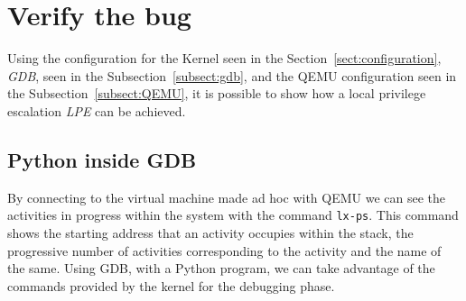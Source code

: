 \documentclass{masterthesis}
\newcommand{\refToSection}[1]{Section~\ref{sect:#1}\xspace}
\newcommand{\refToSubSection}[1]{Subsection~\ref{subsect:#1}\xspace}
\begin{document}
\section{Verify the bug}
\label{sect:bug}


Using the configuration for the Kernel seen in the \refToSection{configuration}, \emph{GDB}, seen in the \refToSubSection{gdb}, and the QEMU configuration seen in the \refToSubSection{QEMU}, it is possible to show how a local privilege escalation \emph{LPE} can be achieved.



\subsection{Python inside GDB}
\label{subsect:py_gdb}

By connecting to the virtual machine made ad hoc with QEMU we can see the activities in progress within the system with the command \texttt{lx-ps}.
This command shows the starting address that an activity occupies within the stack, the progressive number of activities corresponding to the activity and the name of the same.
Using GDB, with a Python program, we can take advantage of the commands provided by the kernel for the debugging phase.
\end{document}
